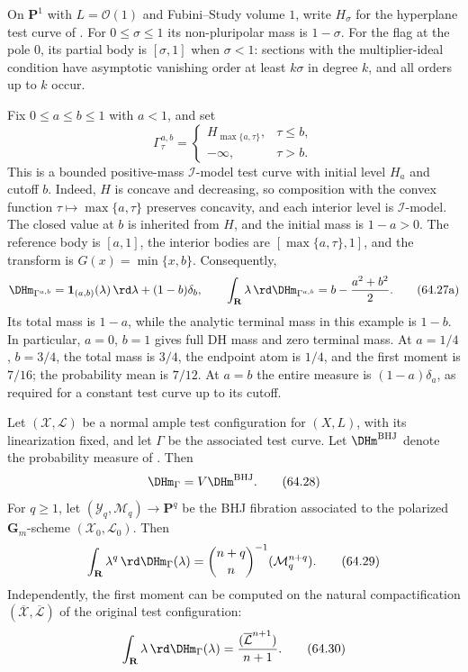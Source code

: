 \begin{example}\label{ex:cma-initial-terminal-masses}
On $\mathbf P^1$ with $L=\mathcal O(1)$ and Fubini--Study volume $1$,
write $H_\sigma$ for the hyperplane test curve of
. For $0\leq\sigma\leq1$ its
non-pluripolar mass is $1-\sigma$. For the flag at the pole $0$, its
partial body is $[\sigma,1]$ when $\sigma<1$: sections with the
multiplier-ideal condition have asymptotic vanishing order at least
$k\sigma$ in degree $k$, and all orders up to $k$ occur.

Fix $0\leq a\leq b\leq1$ with $a<1$, and set
\[
 \Gamma^{a,b}_\tau=
 \begin{cases}
 H_{\max\{a,\tau\}},&\tau\leq b,\\
 -\infty,&\tau>b.
 \end{cases}
\]
This is a bounded positive-mass $\mathcal I$-model test curve with
initial level $H_a$ and cutoff $b$. Indeed, $H$ is concave and decreasing,
so composition with the convex function $\tau\mapsto\max\{a,\tau\}$
preserves concavity, and each interior level is $\mathcal I$-model.
The closed value at $b$ is inherited from $H$, and the initial mass
is $1-a>0$. The reference body is $[a,1]$, the interior bodies are
$[\max\{a,\tau\},1]$, and the transform is $G(x)=\min\{x,b\}$.
Consequently,
\[
 \DHm_{\Gamma^{a,b}}=\mathbf 1_{(a,b)}(\lambda)\,\rd\lambda
                         +(1-b)\delta_b,
 \qquad
 \int_{\mathbf R}\lambda\,\rd\DHm_{\Gamma^{a,b}}
       =b-\frac{a^2+b^2}{2}.
 \tag{64.27a}\label{eq:cma-two-cutoff-dh}
\]
Its total mass is $1-a$, while the analytic terminal mass in this example
is $1-b$. In particular, $a=0$, $b=1$ gives full DH mass and zero
terminal mass. At $a=1/4$, $b=3/4$, the total mass is $3/4$, the endpoint
atom is $1/4$, and the first moment is $7/16$; the probability mean is
$7/12$. At $a=b$ the entire measure is $(1-a)\delta_a$, as required for
a constant test curve up to its cutoff.
\end{example}

\noindent\begin{minipage}{\linewidth}
\begin{theorem}\label{thm:cma-algebraic-dh}
Let $(\mathcal X,\mathcal L)$ be a normal ample test configuration for
$(X,L)$, with its linearization fixed, and let $\Gamma$ be the
associated test curve.
Let $\DHm^{\mathrm{BHJ}}$ denote the probability measure of
\cite{BHJ17}.
Then
\[
                   \DHm_\Gamma=V\DHm^{\mathrm{BHJ}}.
\tag{64.28}\label{eq:cma-dh-normalization}
\]
For $q\geq1$, let
$(\mathcal Y_q,\mathcal M_q)\to\mathbf P^q$ be the BHJ fibration
associated to the polarized $\mathbf G_m$-scheme
$(\mathcal X_0,\mathcal L_0)$.
Then
\[
 \int_{\mathbf R}\lambda^q\,\rd \DHm_\Gamma(\lambda)
 =\binom{n+q}{n}^{-1}(\mathcal M_q^{n+q}).
\tag{64.29}\label{eq:cma-bhj-moments}
\]
Independently, the first moment can be computed on the natural
compactification $(\overline{\mathcal X},\overline{\mathcal L})$ of the
original test configuration:
\[
 \int_{\mathbf R}\lambda\,\rd \DHm_\Gamma(\lambda)
 =\frac{(\overline{\mathcal L}^{n+1})}{n+1}.
\tag{64.30}\label{eq:cma-dh-first-intersection}
\]
\end{theorem}
\end{minipage}\par


